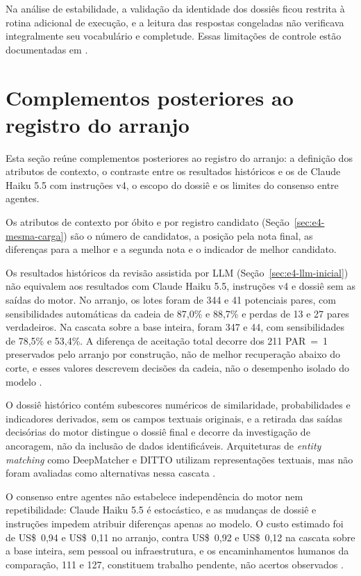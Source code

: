 Na análise de estabilidade, a validação da identidade dos dossiês ficou restrita à rotina adicional de execução, e a leitura das respostas congeladas não verificava integralmente seu vocabulário e completude. Essas limitações de controle estão documentadas em .

\section{Complementos posteriores ao registro do arranjo}\label{sec:e4-ap-posteriores}

Esta seção reúne complementos posteriores ao registro do arranjo: a definição dos atributos de contexto, o contraste entre os resultados históricos e os de Claude Haiku 5.5 com instruções v4, o escopo do dossiê e os limites do consenso entre agentes.

Os atributos de contexto por óbito e por registro candidato (Seção~\ref{sec:e4-mesma-carga}) são o número de candidatos, a posição pela nota final, as diferenças para a melhor e a segunda nota e o indicador de melhor candidato.

Os resultados históricos da revisão assistida por LLM (Seção~\ref{sec:e4-llm-inicial}) não equivalem aos resultados com Claude Haiku 5.5, instruções v4 e dossiê sem as saídas do motor. No arranjo, os lotes foram de 344 e 41 potenciais pares, com sensibilidades automáticas da cadeia de 87,0\% e 88,7\% e perdas de 13 e 27 pares verdadeiros. Na cascata sobre a base inteira, foram 347 e 44, com sensibilidades de 78,5\% e 53,4\%. A diferença de aceitação total decorre dos 211 PAR~=~1 preservados pelo arranjo por construção, não de melhor recuperação abaixo do corte, e esses valores descrevem decisões da cadeia, não o desempenho isolado do modelo \cite{Jardim2026phdrepo}.

O dossiê histórico contém subescores numéricos de similaridade, probabilidades e indicadores derivados, sem os campos textuais originais, e a retirada das saídas decisórias do motor distingue o dossiê final e decorre da investigação de ancoragem, não da inclusão de dados identificáveis. Arquiteturas de \textit{entity matching} como DeepMatcher e DITTO utilizam representações textuais, mas não foram avaliadas como alternativas nessa cascata \cite{Mudgal2018deepmatcher,Li2020ditto,Jardim2026phdrepo}.

O consenso entre agentes não estabelece independência do motor nem repetibilidade: Claude Haiku 5.5 é estocástico, e as mudanças de dossiê e instruções impedem atribuir diferenças apenas ao modelo. O custo estimado foi de US\$~0,94 e US\$~0,11 no arranjo, contra US\$~0,92 e US\$~0,12 na cascata sobre a base inteira, sem pessoal ou infraestrutura, e os encaminhamentos humanos da comparação, 111 e 127, constituem trabalho pendente, não acertos observados \cite{Jardim2026phdrepo}.

